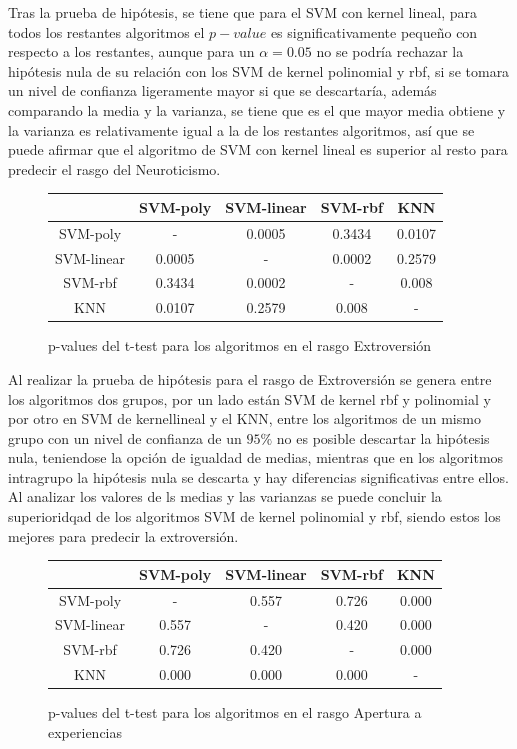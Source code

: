 \documentclass[10pt, a4paper]{article}
\begin{document}
    Tras la prueba de hip\'otesis, se tiene que para el SVM con kernel 
    lineal, para todos los restantes algoritmos el $p-value$ es significativamente peque\~no con respecto a los restantes, 
    aunque para un $\alpha = 0.05$ no se podr\'ia rechazar la hip\'otesis nula de su relaci\'on con los SVM de kernel polinomial y rbf, si se tomara un 
    nivel de confianza ligeramente mayor si que se descartar\'ia, adem\'as comparando la media y la varianza, se tiene que es el que mayor media obtiene y la varianza 
    es relativamente igual a la de los restantes algoritmos, as\'i que se puede afirmar que el algoritmo de SVM con kernel lineal es superior al resto para predecir el rasgo del Neuroticismo. 
    \begin{figure}[H]
        \centering
        \begin{tabular}{|c|c|c|c|c|}
            \cline{2-5} \multicolumn{1}{c|}{ }& SVM-poly& SVM-linear & SVM-rbf & KNN \\ 
            \hline SVM-poly & - & 0.0005 &  0.3434 & 0.0107 \\ 
            \hline SVM-linear & 0.0005 & - & 0.0002 & 0.2579 \\ 
            \hline SVM-rbf &0.3434 & 0.0002 & - & 0.008 \\ 
            \hline KNN & 0.0107 & 0.2579 & 0.008 & - \\ 
            \hline
        \end{tabular}
        \caption{p-values del t-test para los algoritmos en el rasgo Extroversi\'on}
    \end{figure}

    Al realizar la prueba de hip\'otesis para el rasgo de Extroversi\'on se genera entre los algoritmos dos grupos, 
    por un lado est\'an SVM de kernel rbf y polinomial y por otro en SVM de kernellineal y el KNN, entre los algoritmos de un mismo 
    grupo con un nivel de confianza de un $95\%$ no es posible descartar la hip\'otesis nula, teniendose la opci\'on de igualdad de medias, mientras que 
    en los algoritmos intragrupo la hip\'otesis nula se descarta y hay diferencias significativas entre ellos. Al analizar los valores de ls medias y las varianzas se 
    puede concluir la superioridqad de los algoritmos SVM de kernel polinomial y rbf, siendo estos los mejores para predecir la extroversi\'on. 

    \begin{figure}[H]
        \centering
        \begin{tabular}{|c|c|c|c|c|}
            \cline{2-5} \multicolumn{1}{c|}{ }& SVM-poly& SVM-linear & SVM-rbf & KNN \\ 
            \hline SVM-poly & - & 0.557 &  0.726 & 0.000 \\ 
            \hline SVM-linear & 0.557 & - & 0.420 & 0.000 \\ 
            \hline SVM-rbf &0.726 & 0.420 & - & 0.000 \\ 
            \hline KNN & 0.000 & 0.000 & 0.000 & - \\ 
            \hline
        \end{tabular}
        \caption{p-values del t-test para los algoritmos en el rasgo Apertura a experiencias}
    \end{figure}
\end{document}
